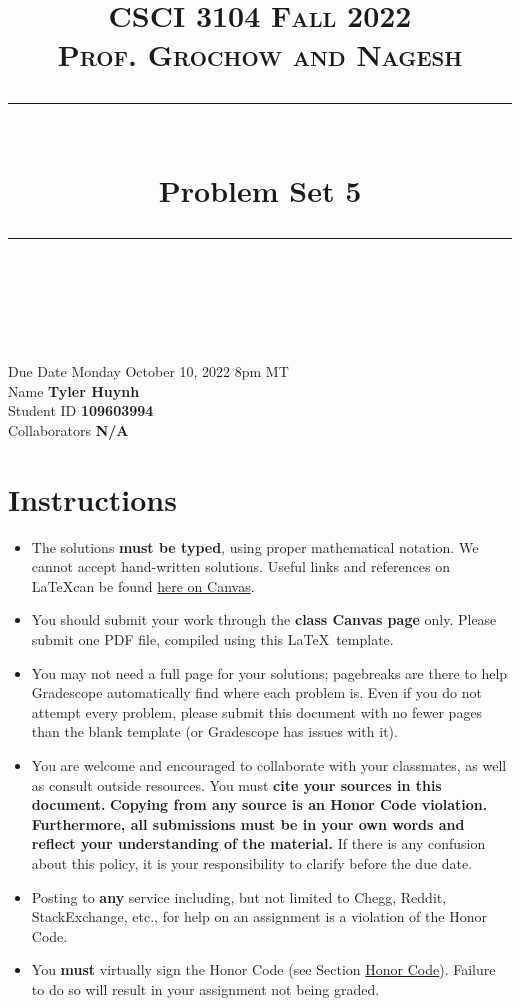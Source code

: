 \documentclass[11pt]{article}
\title{
\normalfont \normalsize 
\textsc{CSCI 3104 Fall 2022 \\ 
Prof. Grochow and Nagesh} \\
[10pt] 
\rule{\linewidth}{0.5pt} \\[6pt] 
\huge Problem Set 5 \\
\rule{\linewidth}{2pt}  \\[10pt]
}
\date{}
\theoremstyle{definition}
\theoremstyle{definition}
\theoremstyle{definition}
\begin{document}
\maketitle


\noindent
Due Date \dotfill Monday October 10, 2022 8pm MT \\
Name \dotfill \textbf{Tyler Huynh} \\
Student ID \dotfill \textbf{109603994} \\
Collaborators \dotfill \textbf{N/A}

\tableofcontents

\section*{Instructions}
 \begin{itemize}
	\item The solutions \textbf{must be typed}, using proper mathematical notation. We cannot accept hand-written solutions. Useful links and references on \LaTeX can be found \href{https://canvas.colorado.edu/courses/75824/pages/latex}{here on Canvas}.
	\item You should submit your work through the \textbf{class Canvas page} only. Please submit one PDF file, compiled using this \LaTeX \ template.
	\item You may not need a full page for your solutions; pagebreaks are there to help Gradescope automatically find where each problem is. Even if you do not attempt every problem, please submit this document with no fewer pages than the blank template (or Gradescope has issues with it).

	\item You are welcome and encouraged to collaborate with your classmates, as well as consult outside resources. You must \textbf{cite your sources in this document.} \textbf{Copying from any source is an Honor Code violation. Furthermore, all submissions must be in your own words and reflect your understanding of the material.} If there is any confusion about this policy, it is your responsibility to clarify before the due date. 

	\item Posting to \textbf{any} service including, but not limited to Chegg, Reddit, StackExchange, etc., for help on an assignment is a violation of the Honor Code.

	\item You \textbf{must} virtually sign the Honor Code (see Section \hyperlink{HonorCode}{Honor Code}). Failure to do so will result in your assignment not being graded.
\end{itemize}
\end{document}

